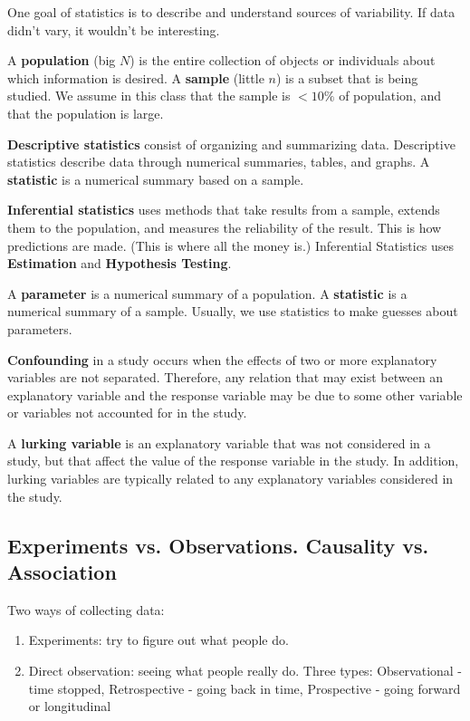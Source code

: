 \documentclass[11pt, oneside]{article}   	%
\begin{document}
One goal of statistics is to describe and understand sources of variability. If data didn't vary, it wouldn't be interesting.

A \textbf{population} (big $N$) is the entire collection of objects or individuals about which information is desired. A \textbf{sample} (little $n$) is a subset that is being studied. We assume in this class that the sample is $< 10\%$ of population, and that the population is large.


\textbf{Descriptive statistics} consist of organizing and summarizing data. Descriptive statistics describe data through numerical summaries, tables, and graphs. A \textbf{statistic} is a numerical summary based on a sample. 

\textbf{Inferential statistics} uses methods that take results from a sample, extends them to the population, and measures the reliability of the result. This is how predictions are made. (This is where all the money is.) 
Inferential Statistics uses \textbf{Estimation} and \textbf{Hypothesis Testing}.

A \textbf{parameter} is a numerical summary of a population. A \textbf{statistic} is a numerical summary of a sample. Usually, we use statistics to make guesses about parameters.

\textbf{Confounding} in a study occurs when the effects of two or more explanatory variables are not separated. Therefore, any relation that may exist between an explanatory variable and the
response variable may be due to some other variable or variables not accounted for in the study.

A \textbf{lurking variable} is an explanatory variable that was not considered in a study, but that affect the value of the response variable in the study. In addition, lurking variables are typically related to any explanatory variables considered in the study. 

\subsection{Experiments vs. Observations. Causality vs. Association}

Two ways of collecting data:
\begin{enumerate}
\item{Experiments: try to figure out what people do. }
\item{Direct observation: seeing what people really do. Three types: Observational - time stopped, Retrospective - going back in time, Prospective - going forward or longitudinal}
\end{enumerate}
\end{document}
